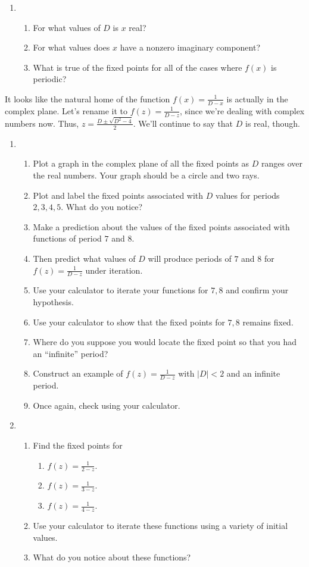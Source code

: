 \documentclass[../gatm.tex]{subfiles}
\begin{document}
\begin{enumerate}
\item \begin{enumerate}
\item For what values of $D$ is $x$ real?
\item For what values does $x$ have a nonzero imaginary component?
\item What is true of the fixed points for all of the cases where $f(x)$ is periodic?
\end{enumerate}
\end{enumerate}

It looks like the natural home of the function $f(x)=\frac{1}{D-x}$ is actually in the complex plane. Let's rename it to $f(z)=\frac{1}{D-z}$, since we're dealing with complex numbers now. Thus, $z=\frac{D\pm \sqrt{D^2-4}}{2}$. We'll continue to say that $D$ is real, though.

\begin{enumerate}
\item \begin{enumerate}
\item Plot a graph in the complex plane of all the fixed points as $D$ ranges over the real numbers. Your graph should be a circle and two rays.
\item Plot and label the fixed points associated with $D$ values for periods $2,3,4,5$. What do you notice?
\item Make a prediction about the values of the fixed points associated with functions of period $7$ and $8$.
\item Then predict what values of $D$ will produce periods of $7$ and $8$ for $f(z)=\frac{1}{D-z}$ under iteration.
\item Use your calculator to iterate your functions for $7,8$ and confirm your hypothesis.
\item Use your calculator to show that the fixed points for $7,8$ remains fixed.
\item Where do you suppose you would locate the fixed point so that you had an ``infinite'' period?
\item Construct an example of $f(z)=\frac{1}{D-z}$ with $|D|<2$ and an infinite period.
\item Once again, check using your calculator.
\end{enumerate}
\item \begin{enumerate}
\item Find the fixed points for \begin{multicols}{3}
\begin{enumerate}
\item $f(z)=\frac{1}{2-z}.$
\item $f(z)=\frac{1}{3-z}.$
\item $f(z)=\frac{1}{4-z}.$
\end{enumerate}
\end{multicols}
\item Use your calculator to iterate these functions using a variety of initial values.
\item What do you notice about these functions?
\end{enumerate}
\end{enumerate}
\end{document}
